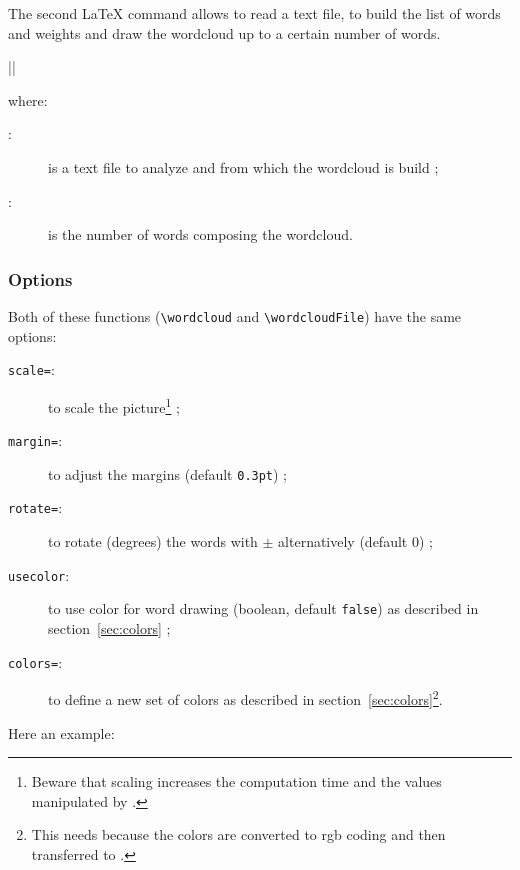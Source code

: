 \documentclass[english]{ltxdoc}
\begin{document}
The second \LaTeX{} command allows to read a text file, to build the list of
words and weights and draw the wordcloud up to a certain number of words.

\commande||\smallskip\index{\wordcloudFile@\lstinline+\wordcloudFile+}

where:
\begin{description}
  \item[:] is a text file to analyze and from which the
  wordcloud is build ;
  \item[:] is the number of words composing the wordcloud.  
\end{description}

\subsubsection{Options}

Both of these functions (\lstinline+\wordcloud+ and \lstinline+\wordcloudFile+)
have the same options:

\begin{description}
  \item[\texttt{scale=}:] to scale the picture\footnote{Beware
  that scaling increases the computation time and the values manipulated by
  .} ;
  \item[\texttt{margin=}:] to adjust the margins
  (default \lstinline+0.3pt+) ;
  \item[\texttt{rotate=}:] to rotate (degrees) the words with
  $\pm$ alternatively (default 0) ;
  \item[\texttt{usecolor}:] to use color for word drawing (boolean, default
  \lstinline+false+) as described in section~\ref{sec:colors} ;
  \item[\texttt{colors=}:] to define a new
  set of colors as described in section~\ref{sec:colors}\footnote{This needs
   because the colors are converted to rgb coding and then
  transferred to .}.
\end{description}
  

Here an example:
\begin{ExempleLaTeX} 
\end{ExempleLaTeX}
\end{document}
